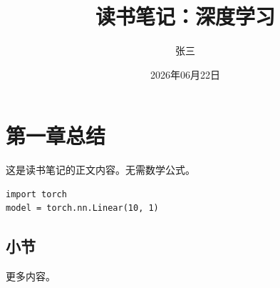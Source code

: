 \documentclass[nomath]{harryopo-paper}
\title{读书笔记：深度学习}
\author{张三}
\date{2026年06月22日}
\begin{document}
\maketitlewithabstract
\section{第一章总结}
这是读书笔记的正文内容。无需数学公式。

\begin{lstlisting}[style=pystyle, caption=示例代码]
import torch
model = torch.nn.Linear(10, 1)
\end{lstlisting}

\subsection{小节}
更多内容。
\end{document}
